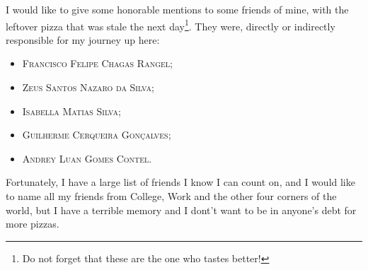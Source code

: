 I would like to give some honorable mentions to some friends of mine, with the leftover pizza that was stale the next day\footnote{Do not forget that these are the one who tastes better!}. They were, directly or indirectly responsible for my journey up here: 
	\begin{itemize}
		\item \textsc{Francisco Felipe Chagas Rangel};
		\item \textsc{Zeus Santos Nazaro da Silva};\item \textsc{Isabella Matias Silva};
		\item \textsc{Guilherme Cerqueira Gonçalves}; \item \textsc{Andrey Luan Gomes Contel}.
	\end{itemize}
\thispagestyle{empty}
Fortunately, I have a large list of friends I know I can count on, and I would like to name all my friends from College, Work and the other four corners of the world, but I have a terrible memory and I dont't want to be in anyone's debt for more pizzas.

